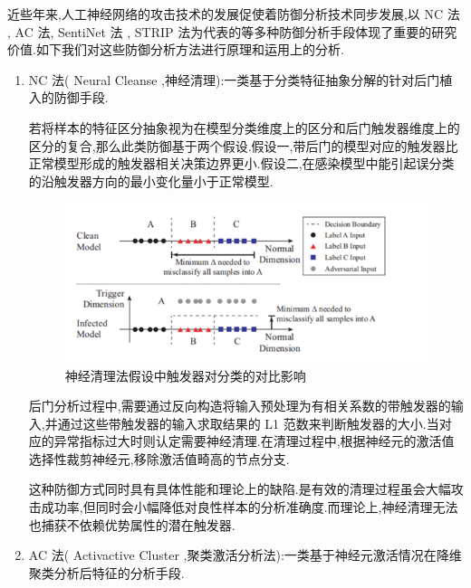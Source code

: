 近些年来,人工神经网络的攻击技术的发展促使着防御分析技术同步发展,以 NC 法 , AC 法, SentiNet 法 , STRIP 法为代表的等多种防御分析手段体现了重要的研究价值.如下我们对这些防御分析方法进行原理和运用上的分析.
\begin{enumerate}
	
	
	\item NC 法( Neural Cleanse ,神经清理):一类基于分类特征抽象分解的针对后门植入的防御手段.
	
	若将样本的特征区分抽象视为在模型分类维度上的区分和后门触发器维度上的区分的复合,那么此类防御基于两个假设.假设一,带后门的模型对应的触发器比正常模型形成的触发器相关决策边界更小.假设二,在感染模型中能引起误分类的沿触发器方向的最小变化量小于正常模型.
	
	\begin{figure}[H]
		\centering
		\includegraphics[scale=0.7]{Figures/toudu.png}
		\caption{神经清理法假设中触发器对分类的对比影响}
	\end{figure}
	
	后门分析过程中,需要通过反向构造将输入预处理为有相关系数的带触发器的输入,并通过这些带触发器的输入求取结果的 L1 范数来判断触发器的大小.当对应的异常指标过大时则认定需要神经清理.在清理过程中,根据神经元的激活值选择性裁剪神经元,移除激活值畸高的节点分支.
	
	这种防御方式同时具有具体性能和理论上的缺陷.是有效的清理过程虽会大幅攻击成功率,但同时会小幅降低对良性样本的分析准确度.而理论上,神经清理无法也捕获不依赖优势属性的潜在触发器.
	
	\item AC 法( Activactive Cluster ,聚类激活分析法):一类基于神经元激活情况在降维聚类分析后特征的分析手段.
	

\end{enumerate}
